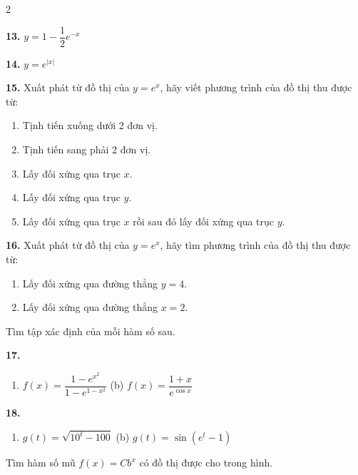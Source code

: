 \begin{multicols}{2}
\vspace{0.3em}
\noindent\parbox[t]{0.48\linewidth}{\textbf{13.} $y = 1 - \dfrac{1}{2}e^{-x}$}
\hfill
\parbox[t]{0.48\linewidth}{\textbf{14.} $y = e^{|x|}$}

\vspace{0.6em}
\noindent\textbf{15.} Xuất phát từ đồ thị của $y = e^x$, hãy viết phương trình của đồ thị thu được từ:
\begin{enumerate}[label=(\alph*),leftmargin=*,itemsep=2pt,topsep=1pt]
\item Tịnh tiến xuống dưới 2 đơn vị.
\item Tịnh tiến sang phải 2 đơn vị.
\item Lấy đối xứng qua trục $x$.
\item Lấy đối xứng qua trục $y$.
\item Lấy đối xứng qua trục $x$ rồi sau đó lấy đối xứng qua trục $y$.
\end{enumerate}

\vspace{0.6em}
\noindent\textbf{16.} Xuất phát từ đồ thị của $y = e^x$, hãy tìm phương trình của đồ thị thu được từ:
\begin{enumerate}[label=(\alph*),leftmargin=*,itemsep=2pt,topsep=1pt]
\item Lấy đối xứng qua đường thẳng $y = 4$.
\item Lấy đối xứng qua đường thẳng $x = 2$.
\end{enumerate}

\vspace{0.6em}
\quad Tìm tập xác định của mỗi hàm số sau.

\vspace{0.3em}
\noindent\textbf{17.}
\begin{enumerate}[label=(\alph*),leftmargin=*,itemsep=2pt,topsep=1pt]
\item $f(x) = \dfrac{1 - e^{x^2}}{1 - e^{1-x^2}}$
\hfill (b) $f(x) = \dfrac{1 + x}{e^{\cos x}}$
\end{enumerate}

\vspace{0.3em}
\noindent\textbf{18.}
\begin{enumerate}[label=(\alph*),leftmargin=*,itemsep=2pt,topsep=1pt]
\item $g(t) = \sqrt{10^t - 100}$
\hfill (b) $g(t) = \sin(e^t - 1)$
\end{enumerate}

\vspace{0.6em}
\quad Tìm hàm số mũ $f(x) = Cb^x$ có đồ thị được cho trong hình.


\end{multicols}
